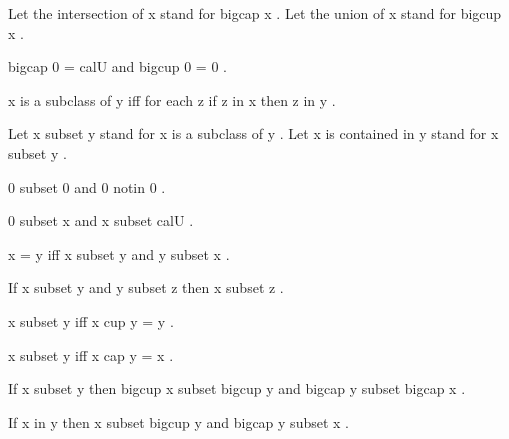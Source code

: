 \documentclass[a4paper,draft]{amsproc}
\begin{document}
\begin{forthel}
Let the intersection of  x  stand for  bigcap x .
Let the union of  x  stand for  bigcup x .

\begin{theorem}
 bigcap 0 = cal{U}  and  bigcup 0 = 0 .
\end{theorem}

\begin{definition}  x  is a subclass of  y  iff 
for each  z  if  z in x  then  z in y .
\end{definition}

Let  x subset y  stand for  x  is a subclass of  y .
Let  x  is contained in  y  stand for  x subset y .

\begin{lemma*}
 0 subset 0  and  0 notin 0 .
\end{lemma*}

\begin{theorem}
 0 subset x  and  x subset cal{U} .
\end{theorem}

\begin{theorem}
 x = y  iff  x subset y  and  y subset x .
\end{theorem}

\begin{theorem}
If  x subset y  and  y subset z  then  x subset z .
\end{theorem}

\begin{theorem}
 x subset y  iff  x cup y = y .
\end{theorem}

\begin{theorem}
 x subset y  iff  x cap y = x .
\end{theorem}

\begin{theorem}
If  x subset y  then  bigcup x subset bigcup y 
and  bigcap y subset bigcap x .
\end{theorem}

\begin{theorem}
If  x in y  then  x subset bigcup y  
and  bigcap y subset x .
\end{theorem}
\end{forthel}
\end{document}
